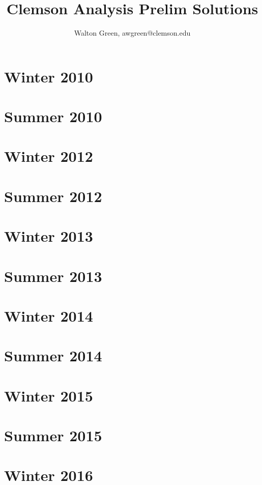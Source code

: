 \documentclass[12pt]{article}
\title{Clemson Analysis Prelim Solutions}
\author{Walton Green, awgreen@clemson.edu}
\begin{document}
\maketitle

\tableofcontents
\newpage
\section{Winter 2010}\label{sec:w10}

\newpage
\section{Summer 2010}\label{sec:s10}

\newpage
\section{Winter 2012}\label{sec:w12}

\newpage
\section{Summer 2012}\label{sec:s12}

\newpage
\section{Winter 2013}\label{sec:w13}

\newpage
\section{Summer 2013}\label{sec:s13}

\newpage
\section{Winter 2014}\label{sec:w14}

\newpage
\section{Summer 2014}\label{sec:s14}

\newpage\section{Winter 2015}\label{sec:w15}

\newpage
\section{Summer 2015}\label{sec:s15}

\newpage
\section{Winter 2016}\label{sec:w16}

\newpage
\end{document}
